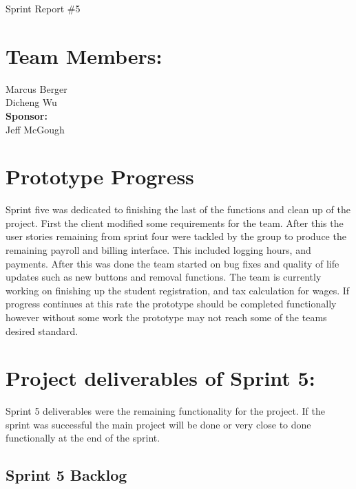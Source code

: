 \documentclass[11pt]{book}
\begin{document}
\fontsize{16}{16}\selectfont Sprint Report \#5


\section{Team Members:}
Marcus Berger
\\Dicheng Wu\\
\textbf{Sponsor:}
\\Jeff McGough
\\

\section{Prototype Progress}


Sprint five was dedicated to finishing the last of the functions and clean up of the project. First the client modified  some requirements for the team. After this the user stories remaining from sprint four were tackled by the group to produce the remaining payroll and billing interface. This included logging hours, and payments. After this was done the team started on bug fixes and quality of life updates such as new buttons and removal functions. The team is currently working on finishing up the student registration, and tax calculation for wages. If progress continues at this rate the prototype should be completed functionally however without some work the prototype may not reach some of the teams desired standard.


\section{Project deliverables of Sprint 5:}

Sprint 5 deliverables were the remaining functionality for the project. If the sprint was successful the main project will be done or very close to done functionally at the end of the sprint.


\subsection{Sprint 5 Backlog}
\end{document}
